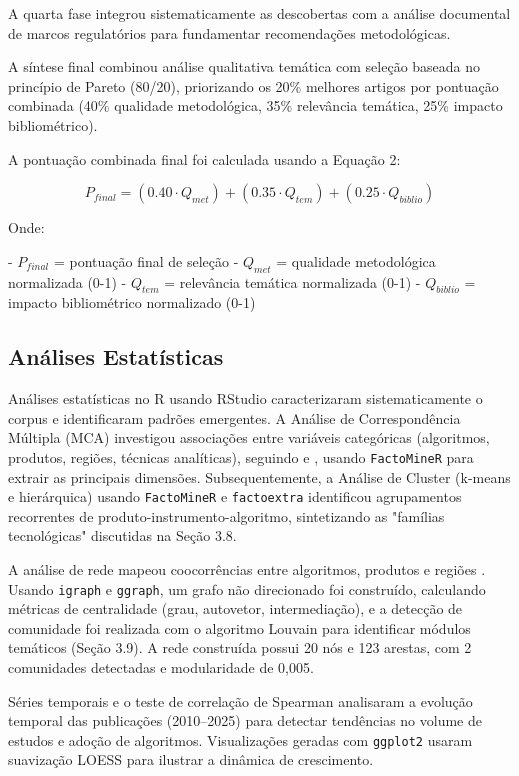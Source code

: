 A quarta fase integrou sistematicamente as descobertas com a análise documental de marcos regulatórios para fundamentar recomendações metodológicas.

A síntese final combinou análise qualitativa temática com seleção baseada no princípio de Pareto (80/20), priorizando os 20\% melhores artigos por pontuação combinada (40\% qualidade metodológica, 35\% relevância temática, 25\% impacto bibliométrico).

A pontuação combinada final foi calculada usando a Equação 2:

$$
P_{final} = (0.40 \cdot Q_{met}) + (0.35 \cdot Q_{tem}) + (0.25 \cdot Q_{biblio})
$$

Onde:

- $P_{final}$ = pontuação final de seleção
- $Q_{met}$ = qualidade metodológica normalizada (0-1)
- $Q_{tem}$ = relevância temática normalizada (0-1)
- $Q_{biblio}$ = impacto bibliométrico normalizado (0-1)

\subsection{Análises Estatísticas}

Análises estatísticas no R  \cite{RCoreTeam2024} usando RStudio  \cite{RStudioTeam2023} caracterizaram sistematicamente o corpus e identificaram padrões emergentes. A Análise de Correspondência Múltipla (MCA) investigou associações entre variáveis categóricas (algoritmos, produtos, regiões, técnicas analíticas), seguindo  \cite{Le2008} e  \cite{Greenacre2017}, usando \texttt{FactoMineR} para extrair as principais dimensões. Subsequentemente, a Análise de Cluster (k-means e hierárquica) usando \texttt{FactoMineR} e \texttt{factoextra} identificou agrupamentos recorrentes de produto-instrumento-algoritmo, sintetizando as "famílias tecnológicas" discutidas na Seção 3.8.

A análise de rede mapeou coocorrências entre algoritmos, produtos e regiões  \cite{Csardi2006, Schoch202}. Usando \texttt{igraph} e \texttt{ggraph}, um grafo não direcionado foi construído, calculando métricas de centralidade (grau, autovetor, intermediação), e a detecção de comunidade foi realizada com o algoritmo Louvain  \cite{Blondel2008} para identificar módulos temáticos (Seção 3.9). A rede construída possui 20 nós e 123 arestas, com 2 comunidades detectadas e modularidade de 0,005.

Séries temporais e o teste de correlação de Spearman  \cite{Spearman1904} analisaram a evolução temporal das publicações (2010--2025) para detectar tendências no volume de estudos e adoção de algoritmos. Visualizações geradas com \texttt{ggplot2} usaram suavização LOESS  \cite{Cleveland1979} para ilustrar a dinâmica de crescimento.

